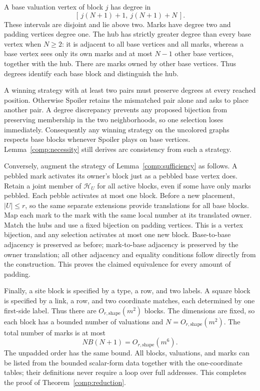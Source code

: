 A base valuation vertex of block $j$ has degree in
\[
                    [\,j(N+1)+1,\ j(N+1)+N\,].
\]
These intervals are disjoint and lie above two.  Marks have degree two
and padding vertices degree one.  The hub has strictly greater degree
than every base vertex when $N\geq2$: it is adjacent to all base
vertices and all marks, whereas a base vertex sees only its own marks
and at most $N-1$ other base vertices, together with the hub.  There
are marks owned by other base vertices.  Thus degrees identify each
base block and distinguish the hub.

A winning strategy with at least two pairs must preserve degrees at
every reached position.  Otherwise Spoiler retains the mismatched pair
alone and asks to place another pair.  A degree discrepancy prevents
any proposed bijection from preserving membership in the two
neighborhoods, so one selection loses immediately.  Consequently any
winning strategy on the uncolored graphs respects base blocks whenever
Spoiler plays on base vertices.  Lemma~\ref{comp:necessity} still derives
arc consistency from such a strategy.

Conversely, augment the strategy of Lemma~\ref{comp:sufficiency} as
follows.  A pebbled mark activates its owner's block just as a pebbled
base vertex does.  Retain a joint member of $\mathcal H_U$ for all active
blocks, even if some have only marks pebbled.  Each pebble activates at
most one block.  Before a new placement, $|U|\leq r$, so the same separate
extensions provide translations for all base blocks.  Map each mark to
the mark with the same local number at its translated owner.  Match
the hubs and use a fixed bijection on padding vertices.  This is a
vertex bijection, and any selection activates at most one new block.
Base-to-base adjacency is preserved as before; mark-to-base adjacency
is preserved by the owner translation; all other adjacency and equality
conditions follow directly from the construction.  This proves the
claimed equivalence for every amount of padding.

Finally, a site block is specified by a type, a row, and two labels.
A square block is specified by a link, a row, and two coordinate
matches, each determined by one first-side label.  Thus there are
$O_{r,\mathrm{shape}}(m^2)$ blocks.  The dimensions are fixed, so each
block has a bounded number of valuations and
$N=O_{r,\mathrm{shape}}(m^2)$.  The total number of marks is at most
\[
                         NB(N+1)=O_{r,\mathrm{shape}}(m^6).
\]
The unpadded order has the same bound.  All blocks, valuations, and
marks can be listed from the bounded scalar-form data together with the
one-coordinate tables; their definitions never require a loop over full
addresses.  This completes the proof of Theorem~\ref{comp:reduction}.
